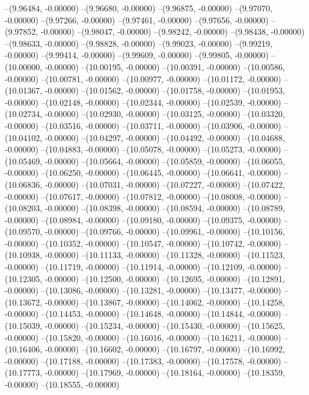 --(9.96484, -0.00000)
--(9.96680, -0.00000)
--(9.96875, -0.00000)
--(9.97070, -0.00000)
--(9.97266, -0.00000)
--(9.97461, -0.00000)
--(9.97656, -0.00000)
--(9.97852, -0.00000)
--(9.98047, -0.00000)
--(9.98242, -0.00000)
--(9.98438, -0.00000)
--(9.98633, -0.00000)
--(9.98828, -0.00000)
--(9.99023, -0.00000)
--(9.99219, -0.00000)
--(9.99414, -0.00000)
--(9.99609, -0.00000)
--(9.99805, -0.00000)
--(10.00000, -0.00000)
--(10.00195, -0.00000)
--(10.00391, -0.00000)
--(10.00586, -0.00000)
--(10.00781, -0.00000)
--(10.00977, -0.00000)
--(10.01172, -0.00000)
--(10.01367, -0.00000)
--(10.01562, -0.00000)
--(10.01758, -0.00000)
--(10.01953, -0.00000)
--(10.02148, -0.00000)
--(10.02344, -0.00000)
--(10.02539, -0.00000)
--(10.02734, -0.00000)
--(10.02930, -0.00000)
--(10.03125, -0.00000)
--(10.03320, -0.00000)
--(10.03516, -0.00000)
--(10.03711, -0.00000)
--(10.03906, -0.00000)
--(10.04102, -0.00000)
--(10.04297, -0.00000)
--(10.04492, -0.00000)
--(10.04688, -0.00000)
--(10.04883, -0.00000)
--(10.05078, -0.00000)
--(10.05273, -0.00000)
--(10.05469, -0.00000)
--(10.05664, -0.00000)
--(10.05859, -0.00000)
--(10.06055, -0.00000)
--(10.06250, -0.00000)
--(10.06445, -0.00000)
--(10.06641, -0.00000)
--(10.06836, -0.00000)
--(10.07031, -0.00000)
--(10.07227, -0.00000)
--(10.07422, -0.00000)
--(10.07617, -0.00000)
--(10.07812, -0.00000)
--(10.08008, -0.00000)
--(10.08203, -0.00000)
--(10.08398, -0.00000)
--(10.08594, -0.00000)
--(10.08789, -0.00000)
--(10.08984, -0.00000)
--(10.09180, -0.00000)
--(10.09375, -0.00000)
--(10.09570, -0.00000)
--(10.09766, -0.00000)
--(10.09961, -0.00000)
--(10.10156, -0.00000)
--(10.10352, -0.00000)
--(10.10547, -0.00000)
--(10.10742, -0.00000)
--(10.10938, -0.00000)
--(10.11133, -0.00000)
--(10.11328, -0.00000)
--(10.11523, -0.00000)
--(10.11719, -0.00000)
--(10.11914, -0.00000)
--(10.12109, -0.00000)
--(10.12305, -0.00000)
--(10.12500, -0.00000)
--(10.12695, -0.00000)
--(10.12891, -0.00000)
--(10.13086, -0.00000)
--(10.13281, -0.00000)
--(10.13477, -0.00000)
--(10.13672, -0.00000)
--(10.13867, -0.00000)
--(10.14062, -0.00000)
--(10.14258, -0.00000)
--(10.14453, -0.00000)
--(10.14648, -0.00000)
--(10.14844, -0.00000)
--(10.15039, -0.00000)
--(10.15234, -0.00000)
--(10.15430, -0.00000)
--(10.15625, -0.00000)
--(10.15820, -0.00000)
--(10.16016, -0.00000)
--(10.16211, -0.00000)
--(10.16406, -0.00000)
--(10.16602, -0.00000)
--(10.16797, -0.00000)
--(10.16992, -0.00000)
--(10.17188, -0.00000)
--(10.17383, -0.00000)
--(10.17578, -0.00000)
--(10.17773, -0.00000)
--(10.17969, -0.00000)
--(10.18164, -0.00000)
--(10.18359, -0.00000)
--(10.18555, -0.00000)
